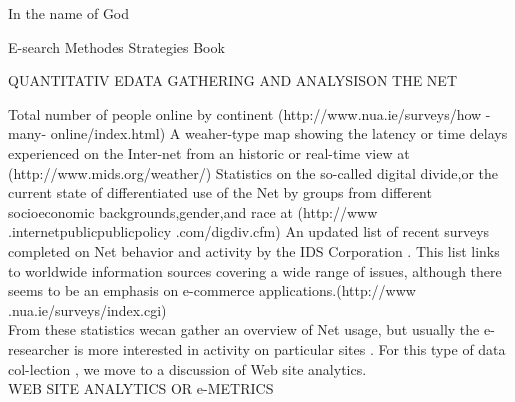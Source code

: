 \documentclass[a4paper,12pt]{article}
\begin{document}
\noindent
In the name of God

\vspace{0.1cm}
\vspace{0.1cm}
\vspace{0.1cm}
\noindent
E-search Methodes Strategies Book
\vspace{0.1cm}
\vspace{0.1cm}
\vspace{0.1cm}
\noindent

 QUANTITATIV EDATA GATHERING AND ANALYSISON THE NET

\noindent
 Total number of people online by continent (http://www.nua.ie/surveys/how - many- online/index.html)
A weaher-type map showing the latency or time delays experienced on the Inter-net from an historic or real-time view at (http://www.mids.org/weather/)
Statistics on the so-called digital divide,or the current state of differentiated use of the Net by groups from different socioeconomic backgrounds,gender,and race at (http://www
.internetpublicpublicpolicy .com/digdiv.cfm)
An updated list of recent surveys completed on Net behavior and activity by the IDS Corporation . This list links to worldwide information sources covering a wide range of issues, although there seems to be an emphasis on e-commerce applications.(http://www
.nua.ie/surveys/index.cgi)\\

\noindent
From these statistics wecan gather an overview of Net usage, but usually the e-researcher is more interested in activity on particular sites . For this type of data col-lection , we move to a discussion of Web site analytics.
\\ WEB SITE ANALYTICS OR e-METRICS\\
\vspace{0.1cm}
\vspace{0.1cm}

\noindent

  
 \vspace{0.1cm}
\vspace{0.1cm}
\vspace{0.1cm}
\end{document}
